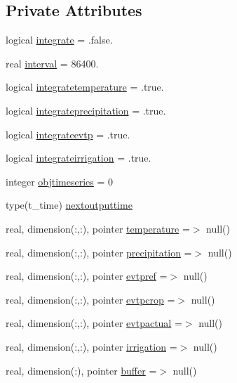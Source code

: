 \subsection*{Private Attributes}
\begin{DoxyCompactItemize}
\item 
logical \mbox{\hyperlink{structmodulebasin_1_1t__integration_ae378365f135a25291309c06f47a2d65b}{integrate}} = .false.
\item 
real \mbox{\hyperlink{structmodulebasin_1_1t__integration_ad5cd0681fbdbae21f51912ba383f2a37}{interval}} = 86400.
\item 
logical \mbox{\hyperlink{structmodulebasin_1_1t__integration_afdc1765ac87be4ca174a60fbe32409d6}{integratetemperature}} = .true.
\item 
logical \mbox{\hyperlink{structmodulebasin_1_1t__integration_a5cd60543e9f15e3b4777e738b9516ae4}{integrateprecipitation}} = .true.
\item 
logical \mbox{\hyperlink{structmodulebasin_1_1t__integration_ac77d6a662a463b75b3d6d5c6270e6c81}{integrateevtp}} = .true.
\item 
logical \mbox{\hyperlink{structmodulebasin_1_1t__integration_aec25ef30cb3349ad743629d8bb8d29f7}{integrateirrigation}} = .true.
\item 
integer \mbox{\hyperlink{structmodulebasin_1_1t__integration_a75a73361a794bcd2fe5827ca1a14bade}{objtimeseries}} = 0
\item 
type(t\+\_\+time) \mbox{\hyperlink{structmodulebasin_1_1t__integration_a5c738f8efcf0841065f6e936692f9d05}{nextoutputtime}}
\item 
real, dimension(\+:,\+:), pointer \mbox{\hyperlink{structmodulebasin_1_1t__integration_a3dff24459ef4c95dc209ba5c8af322bd}{temperature}} =$>$ null()
\item 
real, dimension(\+:,\+:), pointer \mbox{\hyperlink{structmodulebasin_1_1t__integration_a47e4c5284c3c115db50e660e37868b32}{precipitation}} =$>$ null()
\item 
real, dimension(\+:,\+:), pointer \mbox{\hyperlink{structmodulebasin_1_1t__integration_aa697595bd4cc24090cff43eca7c14e7f}{evtpref}} =$>$ null()
\item 
real, dimension(\+:,\+:), pointer \mbox{\hyperlink{structmodulebasin_1_1t__integration_a228a35e509e5be77b800b01ad818f6cd}{evtpcrop}} =$>$ null()
\item 
real, dimension(\+:,\+:), pointer \mbox{\hyperlink{structmodulebasin_1_1t__integration_a28d473f80294aea2f6234848624aa424}{evtpactual}} =$>$ null()
\item 
real, dimension(\+:,\+:), pointer \mbox{\hyperlink{structmodulebasin_1_1t__integration_ad17c4d3b5e63d6e1421fa70c5b7b4939}{irrigation}} =$>$ null()
\item 
real, dimension(\+:), pointer \mbox{\hyperlink{structmodulebasin_1_1t__integration_a073032d3e77a068979bfa43e2a5cec63}{buffer}} =$>$ null()
\end{DoxyCompactItemize}


